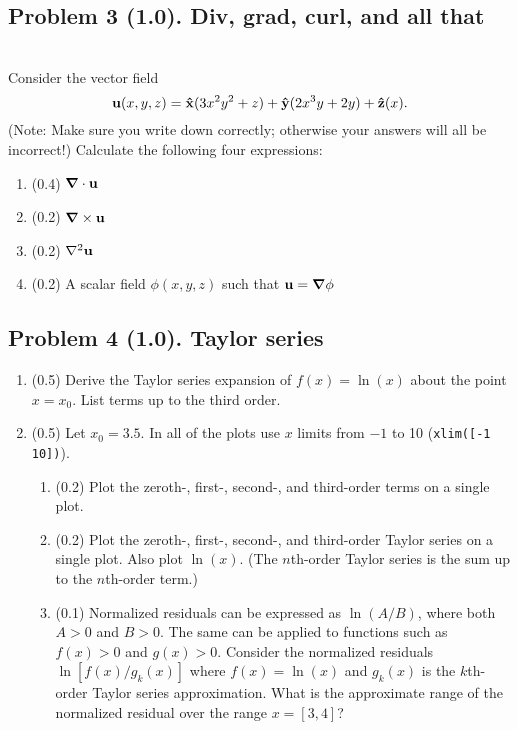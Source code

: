 \documentclass[11pt,titlepage,fleqn]{article}
\begin{document}

\pagebreak
\subsection*{Problem 3 (1.0). Div, grad, curl, and all that}

\citep[][p.~473, P13]{SteinWysession} \\
Consider the vector field
%
\begin{equation}
\mbox{${\bf u}$}(x,y,z) = \mbox{\boldmath{$\hat{\rm x}$}}(3x^2y^2 + z) + \mbox{\boldmath{$\hat{\rm y}$}}(2x^3y+2y) + \mbox{\boldmath{$\hat{\rm z}$}}(x).
\label{vec}
\end{equation}
%
(Note: Make sure you write down  correctly; otherwise your answers will all be incorrect!) Calculate the following four expressions:
%
\begin{enumerate}
\item (0.4) $\mbox{\boldmath $\nabla$} \cdot \mbox{${\bf u}$}$
\item (0.2) $\mbox{\boldmath $\nabla$} \times \mbox{${\bf u}$}$
\item (0.2) $\nabla^2\mbox{${\bf u}$}$
\item (0.2) A scalar field $\phi(x,y,z)$ such that $\mbox{${\bf u}$}=\mbox{\boldmath $\nabla$}\phi$
\end{enumerate}


\subsection*{Problem 4 (1.0). Taylor series}

\begin{enumerate}
\item (0.5) Derive the Taylor series expansion of $f(x) = \ln(x)$ about the point $x = x_0$. List terms up to the third order.

\item (0.5) Let $x_0 = 3.5$. In all of the plots use $x$ limits from $-1$ to 10 (\verb+xlim([-1 10])+).
%
\begin{enumerate}
\item (0.2) Plot the zeroth-, first-, second-, and third-order terms on a single plot.

\item (0.2) Plot the zeroth-, first-, second-, and third-order Taylor series on a single plot. Also plot $\ln(x)$.
(The $n$th-order Taylor series is the sum up to the $n$th-order term.) 

\item (0.1) Normalized residuals can be expressed as $\ln(A/B)$, where both $A > 0$ and $B > 0$.
The same can be applied to functions such as $f(x) > 0$ and $g(x) > 0$.
Consider the normalized residuals $\ln[ f(x) / g_k(x) ]$ where $f(x) = \ln(x)$ and $g_k(x)$ is the $k$th-order Taylor series approximation. What is the approximate range of the normalized residual over the range $x = [3,4]$?
\end{enumerate}

\end{enumerate}
\end{document}
